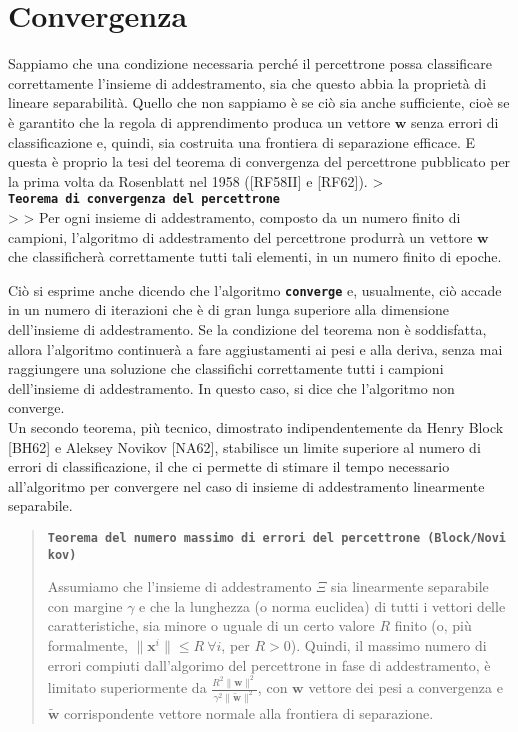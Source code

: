\documentclass[
  letterpaper,
  DIV=11,
  numbers=noendperiod]{scrreprt}
\begin{document}
\section{Convergenza}\label{convergenza}

Sappiamo che una condizione necessaria perché il percettrone possa
classificare correttamente l'insieme di addestramento, sia che questo
abbia la proprietà di lineare separabilità. Quello che non sappiamo è se
ciò sia anche sufficiente, cioè se è garantito che la regola di
apprendimento produca un vettore \(\mathbf{w}\) senza errori di
classificazione e, quindi, sia costruita una frontiera di separazione
efficace. E questa è proprio la tesi del teorema di convergenza del
percettrone pubblicato per la prima volta da Rosenblatt nel 1958
({[}RF58II{]} e {[}RF62{]}). \textgreater{}
\textbf{\texttt{Teorema\ di\ convergenza\ del\ percettrone}}\\
\textgreater{} \textgreater{} Per ogni insieme di addestramento,
composto da un numero finito di campioni, l'algoritmo di addestramento
del percettrone produrrà un vettore \(\mathbf{w}\) che classificherà
correttamente tutti tali elementi, in un numero finito di epoche.

Ciò si esprime anche dicendo che l'algoritmo \textbf{\texttt{converge}}
e, usualmente, ciò accade in un numero di iterazioni che è di gran lunga
superiore alla dimensione dell'insieme di addestramento. Se la
condizione del teorema non è soddisfatta, allora l'algoritmo continuerà
a fare aggiustamenti ai pesi e alla deriva, senza mai raggiungere una
soluzione che classifichi correttamente tutti i campioni dell'insieme di
addestramento. In questo caso, si dice che l'algoritmo non converge.\\
Un secondo teorema, più tecnico, dimostrato indipendentemente da Henry
Block {[}BH62{]} e Aleksey Novikov {[}NA62{]}, stabilisce un limite
superiore al numero di errori di classificazione, il che ci permette di
stimare il tempo necessario all'algoritmo per convergere nel caso di
insieme di addestramento linearmente separabile.

\begin{quote}
\textbf{\texttt{Teorema\ del\ numero\ massimo\ di\ errori\ del\ percettrone\ (Block/Novikov)}}

Assumiamo che l'insieme di addestramento \(\Xi\) sia linearmente
separabile con margine \(\gamma\) e che la lunghezza (o norma euclidea)
di tutti i vettori delle caratteristiche, sia minore o uguale di un
certo valore \(R\) finito (o, più formalmente,
\(\lVert\mathbf{x}^i\rVert≤R\ \forall i\), per \(R>0\)). Quindi, il
massimo numero di errori compiuti dall'algorimo del percettrone in fase
di addestramento, è limitato superiormente da
\(\frac{R^2\lVert\mathbf{w}\rVert^2}{\gamma^2\rVert\widetilde{\mathbf{w}}\lVert^2}\),
con \(\mathbf{w}\) vettore dei pesi a convergenza e
\(\widetilde{\mathbf{w}}\) corrispondente vettore normale alla frontiera
di separazione.
\end{quote}
\end{document}
